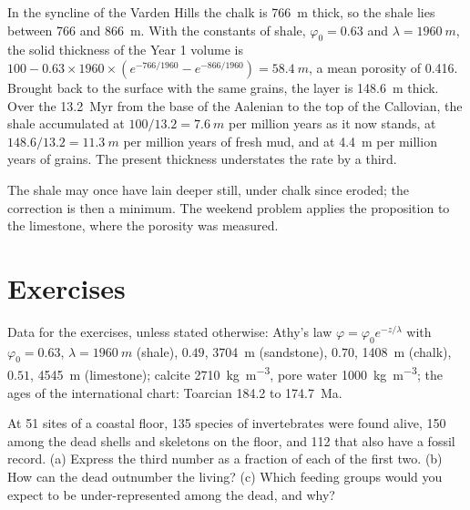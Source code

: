 \begin{example}\label{ex:b2:palaeoenvironments:shale}
In the syncline of the Varden Hills the chalk is \qty{766}{m} thick, so the shale lies between
766 and \qty{866}{m}. With the constants of shale, $\varphi_0 = 0.63$ and $\lambda =
\qty{1960}{m}$, the solid thickness of the Year 1 volume is $100 - 0.63 \times 1960 \times
(e^{-766/1960} - e^{-866/1960}) = \qty{58.4}{m}$, a mean porosity of 0.416. Brought back to the
surface with the same grains, the layer is \qty{148.6}{m} thick. Over the \qty{13.2}{Myr} from
the base of the Aalenian to the top of the Callovian, the shale accumulated at $100/13.2 =
\qty{7.6}{m}$ per million years as it now stands, at $148.6/13.2 = \qty{11.3}{m}$ per million
years of fresh mud, and at \qty{4.4}{m} per million years of grains. The present thickness
understates the rate by a third.
\end{example}

The shale may once have lain deeper still, under chalk since eroded; the correction is then a
minimum. The weekend problem applies the proposition to the limestone, where the porosity was
measured.

\section*{Exercises}\label{sec:b2:palaeoenvironments:exercises}

Data for the exercises, unless stated otherwise: Athy's law $\varphi = \varphi_0 e^{-z/\lambda}$
with $\varphi_0 = 0.63$, $\lambda = \qty{1960}{m}$ (shale), $0.49$, \qty{3704}{m} (sandstone),
$0.70$, \qty{1408}{m} (chalk), $0.51$, \qty{4545}{m} (limestone); calcite \qty{2710}{kg.m^{-3}},
pore water \qty{1000}{kg.m^{-3}}; the ages of the international chart: Toarcian 184.2 to
\qty{174.7}{Ma}.

\begin{exercise}[$\star$]\label{exo:b2:palaeoenvironments:1}
At 51 sites of a coastal floor, 135 species of invertebrates were found alive, 150 among the dead
shells and skeletons on the floor, and 112 that also have a fossil record. (a) Express the third
number as a fraction of each of the first two. (b) How can the dead outnumber the living? (c)
Which feeding groups would you expect to be under-represented among the dead, and why?
\end{exercise}

